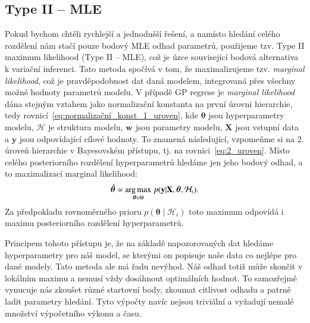 \subsection{Type II – MLE}
\label{subsec:type2-mle}
Pokud bychom chtěli rychlejší a jednodušší řešení, a namísto hledání celého rozdělení nám stačí pouze bodový MLE odhad parametrů, použijeme tzv. Type II maximum likelihood (Type II – MLE), což je úzce související bodová alternativa k variační inferenci.
Tato metoda spočívá v tom, že maximalizujeme tzv. \emph{marginal likelihood}, což je pravděpodobnost dat daná modelem, integrovaná přes všechny možné hodnoty parametrů modelu.
V případě GP regrese je \emph{marginal likelihood} dána stejným vztahem jako normalizační konstanta na první úrovni hierarchie, tedy rovnicí~\eqref{eq:normalizační_konst_1_uroven}, kde $\boldsymbol{\theta}$ jsou hyperparametry modelu, $\mathcal{H}$ je struktura modelu, $\mathbf{w}$ jsou parametry modelu, $\mathbf{X}$ jsou vstupní data a $\mathbf{y}$ jsou odpovídající cílové hodnoty.
To znamená následující, vzpomeňme si na $2.$ úroveň hierarchie v Bayesovském přístupu, tj. na rovnici~\eqref{eq:2_uroven}.
Místo celého posteriorního rozdělení hyperparametrů hledáme jen jeho bodový odhad, a to maximalizací marginal likelihood:
\begin{equation}
  \hat{\boldsymbol{\theta}} = \underset{\boldsymbol{\theta} \in \Theta}{\operatorname*{arg\,max}}\; p( \mathbf{y} | \mathbf{X}, \boldsymbol{\theta}, \mathcal{H}_i).
\end{equation}
Za předpokladu rovnoměrného prioru $p(\boldsymbol{\theta} \mid \mathcal{H}_i)$ toto maximum odpovídá i maximu posteriorního rozdělení hyperparametrů.
\par

Principem tohoto přístupu je, že na základě napozorovaných dat hledáme hyperparametry pro náš model, se kterými on popisuje naše data co nejlépe pro dané modely.
Tato metoda ale má řadu nevýhod.
Náš odhad totiž může skončit v lokálním maximu a nemusí vždy dosáhnout optimálních hodnot.
To samozřejmě vynucuje nás zkoušet různé startovní body, zkoumat citlivost odhadu a patrně ladit parametry hledání.
Tyto výpočty navíc nejsou triviální a vyžadují nemalé množství výpočetního výkonu a času.
\par

